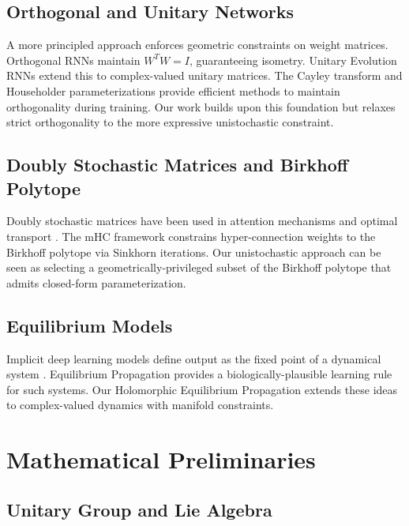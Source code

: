 \documentclass[11pt,a4paper]{article}
\begin{document}
\subsection{Orthogonal and Unitary Networks}

A more principled approach enforces geometric constraints on weight matrices. Orthogonal RNNs \citep{arjovsky2016unitary} maintain $W^TW = I$, guaranteeing isometry. Unitary Evolution RNNs \citep{wisdom2016full} extend this to complex-valued unitary matrices. The Cayley transform \citep{helfrich2018orthogonal} and Householder parameterizations \citep{mhammedi2017efficient} provide efficient methods to maintain orthogonality during training. Our work builds upon this foundation but relaxes strict orthogonality to the more expressive unistochastic constraint.

\subsection{Doubly Stochastic Matrices and Birkhoff Polytope}

Doubly stochastic matrices have been used in attention mechanisms \citep{sander2022sinkformers} and optimal transport \citep{cuturi2013sinkhorn}. The mHC framework \citep{wang2025sparse} constrains hyper-connection weights to the Birkhoff polytope via Sinkhorn iterations. Our unistochastic approach can be seen as selecting a geometrically-privileged subset of the Birkhoff polytope that admits closed-form parameterization.

\subsection{Equilibrium Models}

Implicit deep learning models define output as the fixed point of a dynamical system \citep{bai2019deep,amos2017optnet}. Equilibrium Propagation \citep{scellier2017equilibrium} provides a biologically-plausible learning rule for such systems. Our Holomorphic Equilibrium Propagation extends these ideas to complex-valued dynamics with manifold constraints.

\section{Mathematical Preliminaries}
\label{sec:preliminaries}

\subsection{Unitary Group and Lie Algebra}
\end{document}
